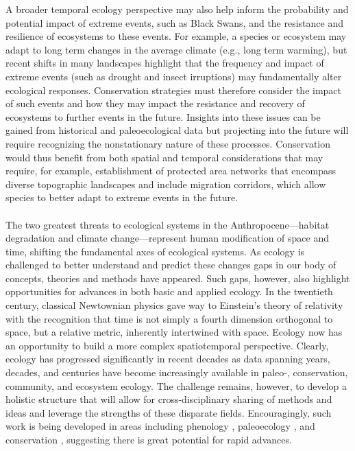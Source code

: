 \documentclass[11pt,a4paper,oneside]{article}
\begin{document}
A broader temporal ecology perspective may also help inform the probability and potential impact of extreme events, such as Black Swans, and the resistance and resilience of ecosystems to these events. For example, a species or ecosystem may adapt to long term changes in the average climate (e.g., long term warming), but recent shifts in many landscapes \citep[e.g.,][]{Anderegg2013} highlight that the frequency and impact of extreme events (such as drought and insect irruptions) may fundamentally alter ecological responses. Conservation strategies must therefore consider the impact of such events and how they may impact the resistance and recovery of ecosystems to further events in the future. Insights into these issues can be gained from historical and paleoecological data but projecting into the future will require recognizing the nonstationary nature of these processes. Conservation would thus benefit from both spatial and temporal considerations that may require, for example, establishment of protected area networks that encompass diverse topographic landscapes and include migration corridors, which allow species to better adapt to extreme events in the future. \\

\\

\noindent The two greatest threats to ecological systems in the Anthropocene---habitat degradation and climate change---represent human modification of space and time, shifting the fundamental axes of ecological systems. As ecology is challenged to better understand and predict these changes gaps in our body of concepts, theories and methods have appeared. Such gaps, however, also highlight opportunities for advances in both basic and applied ecology. In the twentieth century, classical Newtownian physics gave way to Einstein's theory of relativity with the recognition that time is not simply a fourth dimension orthogonal to space, but a relative metric, inherently intertwined with space. Ecology now has an opportunity to build a more complex spatiotemporal perspective. Clearly, ecology has progressed significantly in recent decades as data spanning years, decades, and centuries have become increasingly available in paleo-, conservation, community, and ecosystem ecology. The challenge remains, however, to develop a holistic structure that will allow for cross-disciplinary sharing of methods and ideas and leverage the strengths of these disparate fields. Encouragingly, such work is being developed in areas including phenology \citep{Pau:2011wd}, paleoecology \citep{Brewer2012}, and conservation \citep{mooers2008}, suggesting there is great potential for rapid advances. \\
\end{document}
